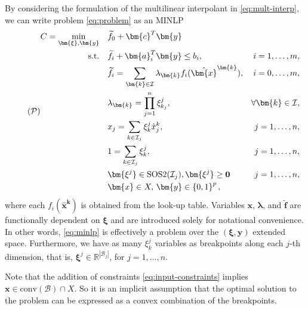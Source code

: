 \documentclass[pdflatex,sn-mathphys-num]{sn-jnl}%
\newcommand{\new}[1]{#1}
\newcommand{\R}{\mathbb{R}}
\begin{document}
By considering the formulation of the multilinear interpolant in \eqref{eq:mult-interp}, we can write problem \eqref{eq:problem} as an MINLP
\begin{equation}\label{eq:minlp}\tag{$\mathcal{P}$}
\begin{aligned}
    C = \min_{\bm{\xi},\bm{y}} \quad & \widetilde{f}_0 + \bm{c}^{T} \bm{y}  \\
    \textrm{s.t.} \quad & \widetilde{f}_i + \bm{a}_i^{T} \bm{y} \le b_i, & i=1,\ldots,m, \\
			& \widetilde{f}_i = \sum_{\bm{k}\in\mathcal{I}} \lambda_{\bm{k}}  f_i(\hat{\bm{x}}^{\bm{k}}), & i=0,\ldots,m, \\
   &\lambda_{\bm{k}} = \prod_{j=1}^{n} \xi^j_{k_j}, &
     \forall \bm{k}\in\mathcal{I}, \\
   &x_{j} = \sum_{k\in\mathcal{I}_j} \xi^j_{k} \hat{x}_{j}^{k}, &j=1,\ldots,n, \\
   &1 = \sum_{k\in\mathcal{I}_j} \xi^j_{k}, &j=1,\ldots,n, \\
      & \bm{\xi^j} \in \text{SOS2}(\mathcal{I}_j), \bm{\xi^j}\geq \mathbf{0} & j=1,\ldots,n, \\
      & \bm{x}\in X, \,\bm{y}\in \left\{ 0,1 \right\}^{p}
,\end{aligned}
\end{equation}
where each $f_i(\hat{\bm{x}}^{\bm{k}})$ is obtained from the look-up table.
\new{%
Variables $\bm{x}$, $\bm{\lambda}$, and $\widetilde{\bm{f}}$ are functionally dependent on $\bm{\xi}$ and are introduced solely for notational convenience.
In other words, \ref{eq:minlp} is effectively a problem over the $(\bm{\xi},\bm{y})$ extended space.
Furthermore, we have as many $\xi^j_k$ variables as breakpoints along each $j$-th dimension, that is, $\bm{\xi}^j\in \R^{|\mathcal{B}_j|}$, for $j=1,\ldots,n$.
}

\new{%
Note that the addition of constraints \eqref{eq:input-constraints} implies $\bm{x} \in \text{conv}(\mathcal{B}) \cap X$.
So it is an implicit assumption that the optimal solution to the problem can be expressed as a convex combination of the breakpoints.
}
\end{document}
